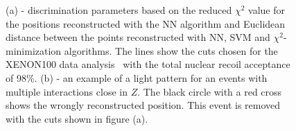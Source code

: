 \begin{figure}[!h]
\centering
{}
\caption[Discrimination parameters based on the $\chi^{2}$ and the Euclidean distance, and an example of light pattern for a multiple scattering event]{(a) - discrimination parameters based on the reduced $\chi^{2}$ value for the positions reconstructed with the NN algorithm and Euclidean distance between the points reconstructed with NN, SVM and $\chi^{2}$-minimization algorithms. The lines show the cuts chosen for the XENON100 data analysis~\cite{xe100-run08} with the total nuclear recoil acceptance of 98\%. (b) - an example of a light pattern for an events with multiple interactions close in $Z$. The black circle with a red cross shows the wrongly reconstructed position. This event is removed with the cuts shown in figure (a).}
\label{figPosRecCutsResults}
\end{figure}


